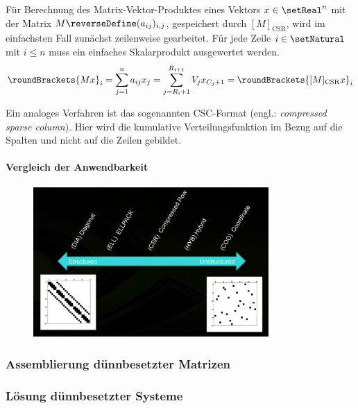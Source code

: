 \documentclass[crop=false]{standalone}
\begin{document}
        Für Berechnung des Matrix-Vektor-Produktes eines Vektors $x\in\setReal^n$ mit der Matrix $M \reverseDefine (a_{ij})_{i,j}$, gespeichert durch $[M]_\mathrm{CSR}$, wird im einfachsten Fall zunächst zeilenweise gearbeitet.
        Für jede Zeile $i\in\setNatural$ mit $i\leq n$ muss ein einfaches Skalarprodukt ausgewertet werden.
        \[
          \roundBrackets{Mx}_i = \sum_{j=1}^n a_{ij} x_j = \sum_{j=R_i+1}^{R_{i+1}} V_j x_{C_{j}+1} = \roundBrackets{[M]_\mathrm{CSR}x}_i
        \]

        Ein analoges Verfahren ist das sogenannten CSC-Format (engl.: \textit{compressed sparse column}).
        Hier wird die kumulative Verteilungsfunktion im Bezug auf die Spalten und nicht auf die Zeilen gebildet.
        \cite{Bell2008}



        \paragraph{Vergleich der Anwendbarkeit} %
        \label{par:vergleich_der_anwendbarkeit}
          \begin{figure}[h]
            \center
            \includegraphics[width=0.8\textwidth]{images/comparison_sparse_matrix_formats.png}
          \end{figure}

      \subsubsection{Assemblierung dünnbesetzter Matrizen} %
      \label{ssub:assemblierung_dünnbesetzter_matrizen}


      \subsubsection{Lösung dünnbesetzter Systeme} %
      \label{ssub:lösung_dünnbesetzter_systeme}
        \cite[S.~101~ff]{Nocedal2006}
\end{document}
